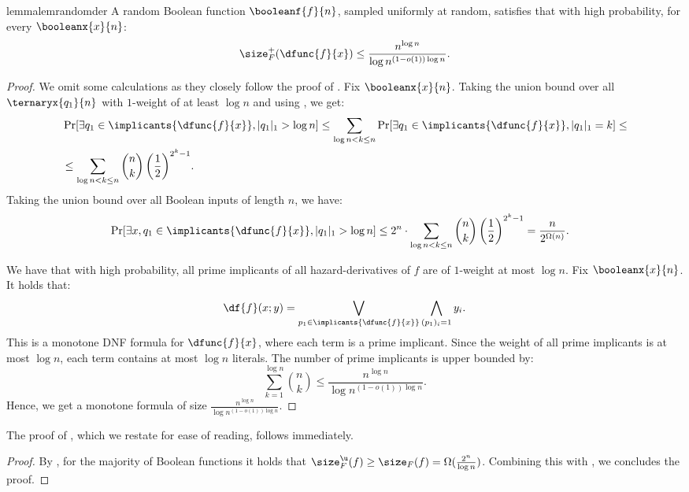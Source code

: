 \documentclass[acmsmall, nonacm, authorversion]{acmart}
\begin{document}
\begin{restatable}{lemma}{lemrandomder}\label{lem:random-der}
A random Boolean function $\booleanf{f}{n}$, sampled uniformly at random, 
satisfies that with high probability, for every $\booleanx{x}{n}$:
\[
\size_F^{+}(\dfunc{f}{x})\le\frac{n^{\log n}}{\log n ^{(1-o(1))\log n}}.
\]
\end{restatable}
\begin{proof}
We omit some calculations as they closely follow the proof of . Fix $\booleanx{x}{n}$. Taking the union bound over all $\ternaryx{q_1}{n}$ with $1$-weight of at least $\log{n}$ and using , we get:
\begin{align*}
&\Pr[\exists q_1\in \implicants{\dfunc{f}{x}}, |q_1|_1>\log{n}]\le\sum_{\log{n}<k\leq n}{\Pr[\exists q_1\in \implicants{\dfunc{f}{x}}, |q_1|_1=k]}\leq\\
&\leq\sum_{\log{n}<k\leq n}{ \binom{n}{k}\left(\frac{1}{2}\right)^{2^k-1}}.
\end{align*}
Taking the union bound over all Boolean inputs of length $n$, we have:
\begin{align*}
&\Pr[\exists x, q_1\in \implicants{\dfunc{f}{x}}, |q_1|_1>\log{n}]\leq 2^n \cdot\sum_{\log{n}<k\leq n}{ \binom{n}{k}\left(\frac{1}{2}\right)^{2^k-1}}=\frac{n}{2^{\Omega(n)}}.
\end{align*}

We have that with high probability, all prime implicants of all hazard-derivatives of $f$ are of $1$-weight at most $\log{n}$.
Fix $\booleanx{x}{n}$. It holds that: 
\[
\df{f}(x;y)=\bigvee_{p_1 \in \implicants{\dfunc{f}{x}}}\bigwedge_{(p_1)_i=1}{y_i}.
\]
This is a monotone DNF formula for $\dfunc{f}{x}$, where each term is a prime implicant. Since the weight of all prime implicants is at most $\log{n}$, each term contains at most $\log{n}$ literals. The number of prime implicants is upper bounded by:
\[\sum_{k=1}^{\log{n}}{\binom{n}{k}}\leq \frac{n^{\log n}}{\log n ^{(1-o(1))\log n}}.
\]
Hence, we get a monotone formula of size $\frac{n^{\log n}}{\log n ^{(1-o(1))\log n}}$.
\end{proof}

The proof of , which we restate for ease of reading, follows immediately.
\proprandomfunctiongap*
\begin{proof}
By , for the majority of Boolean functions it holds that 
$\size_{F}^{\u}(f)\ge \size_{F}(f)=\Omega(\frac{2^n}{\log n})$. 
Combining this with , we concludes the proof.
\end{proof}
\end{document}
